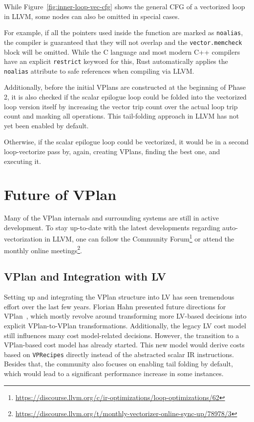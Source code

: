 \documentclass[sigplan,11pt,nonacm]{acmart}
\begin{document}
While Figure~\ref{fig:inner-loop-vec-cfg} shows the general CFG of a vectorized loop in LLVM, some 
nodes can also be omitted in special cases.

For example, if all the pointers used inside the function are marked as \texttt{noalias}, the compiler 
is guaranteed that they will not overlap and the \texttt{vector.memcheck} block will be omitted.
While the C language and most modern C++ compilers have an explicit \texttt{restrict} keyword for this,
Rust automatically applies the \texttt{noalias} attribute to safe references when compiling via LLVM.

Additionally, before the initial VPlans are constructed at the beginning of Phase 2, it is also checked if 
the scalar epilogue loop could be folded into the vectorized loop version itself by increasing the vector 
trip count over the actual loop trip count and masking all operations. This tail-folding approach in LLVM 
has not yet been enabled by default.

Otherwise, if the scalar epilogue loop could be vectorized, it would be in a second loop-vectorize 
pass by, again, creating VPlans, finding the best one, and executing it.

\section{Future of VPlan}
Many of the VPlan internals and surrounding systems are still in active development. To stay up-to-date 
with the latest developments regarding auto-vectorization in LLVM, one can follow the 
Community Forum\footnote{\url{https://discourse.llvm.org/c/ir-optimizations/loop-optimizations/62}} or
attend the monthly online 
meetings\footnote{\url{https://discourse.llvm.org/t/monthly-vectorizer-online-sync-up/78978/3}}.

\subsection{VPlan and Integration with LV}
Setting up and integrating the VPlan structure into LV has seen tremendous effort over the last 
few years. Florian Hahn presented future directions for 
VPlan~\cite{llvmvplanupdate}, which mostly revolve around transforming more LV-based decisions into
explicit VPlan-to-VPlan transformations. Additionally, the legacy LV cost model still influences 
many cost model-related decisions. However, the transition to a VPlan-based cost model has already 
started. This new model would derive costs based on \texttt{VPRecipes} directly instead of the 
abstracted scalar IR instructions. Besides that, the community also focuses on enabling tail folding by
default, which would lead to a significant performance increase in some instances.
\end{document}
